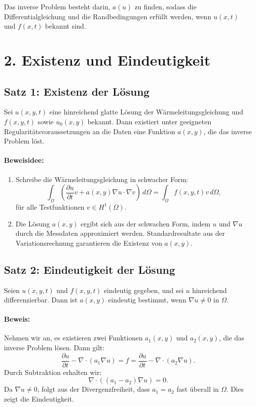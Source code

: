 Das inverse Problem besteht darin, $a(u)$ zu finden, sodass die Differentialgleichung und die Randbedingungen erfüllt werden, wenn $u(x,t)$ und $f(x,t)$ bekannt sind.

\section*{2. Existenz und Eindeutigkeit}

\subsection*{Satz 1: Existenz der Lösung}

Sei $u(x,y,t)$ eine hinreichend glatte Lösung der Wärmeleitungsgleichung und $f(x,y,t)$ sowie $u_0(x,y)$ bekannt. Dann existiert unter geeigneten Regularitätsvoraussetzungen an die Daten eine Funktion $a(x,y)$, die das inverse Problem löst.

\paragraph{Beweisidee:}
\begin{enumerate}
	\item Schreibe die Wärmeleitungsgleichung in schwacher Form:
	\[
	\int_{\Omega} \left( \frac{\partial u}{\partial t} v + a(x,y) \nabla u \cdot \nabla v \right) \, d\Omega = \int_{\Omega} f(x,y,t) v \, d\Omega,
	\]
	für alle Testfunktionen $v \in H^1(\Omega)$.
	\item Die Lösung $a(x,y)$ ergibt sich aus der schwachen Form, indem $u$ und $\nabla u$ durch die Messdaten approximiert werden. Standardresultate aus der Variationsrechnung garantieren die Existenz von $a(x,y)$.
\end{enumerate}

\subsection*{Satz 2: Eindeutigkeit der Lösung}

Seien $u(x,y,t)$ und $f(x,y,t)$ eindeutig gegeben, und sei $u$ hinreichend differenzierbar. Dann ist $a(x,y)$ eindeutig bestimmt, wenn $\nabla u \neq 0$ in $\Omega$.

\paragraph{Beweis:} Nehmen wir an, es existieren zwei Funktionen $a_1(x,y)$ und $a_2(x,y)$, die das inverse Problem lösen. Dann gilt:
\[
\frac{\partial u}{\partial t} - \nabla \cdot (a_1 \nabla u) = f = \frac{\partial u}{\partial t} - \nabla \cdot (a_2 \nabla u).
\]
Durch Subtraktion erhalten wir:
\[
\nabla \cdot \left( (a_1 - a_2) \nabla u \right) = 0.
\]
Da $\nabla u \neq 0$, folgt aus der Divergenzfreiheit, dass $a_1 = a_2$ fast überall in $\Omega$. Dies zeigt die Eindeutigkeit.

